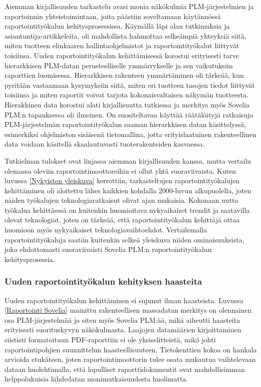 Aiemman kirjallisuuden tarkastelu avasi monia näkökulmia PLM-järjestelmien ja raportoinnin yhteistoimintaan, joita päästiin soveltamaan käytännössä raportointityökalun kehitysprosessissa. Käymällä läpi alan tutkimuksia ja asiantuntija-artikkeleita, oli mahdollista hahmottaa selkeämpiä yhteyksiä siitä, miten tuotteen elinkaaren hallintaohjelmistot ja raportointityökalut liittyvät toisiinsa. Uuden raportointityökalun kehittämisessä korostui erityisesti tarve  hierarkkisen PLM-datan perusteelliselle ymmärrykselle ja sen vaikutuksiin raporttien luomisessa. Hierarkkisen rakenteen ymmärtäminen oli tärkeää, kun pyritään vastaamaan kysymyksiin siitä, miten eri tuotteen tasojen tiedot liittyvät toisiinsa ja miten raportit voivat tarjota kokonaisvaltaisen näkymän tuotteesta. Hierakkinen data korostui alati kirjallisuutta tutkiessa ja merkitys myös Sovelia PLM:n tapauksessa oli ilmeinen. On suositeltavaa käyttää räätälöityjä ratkaisuja PLM-järjestelmän raportointityökalun saaman hierarkkisen datan käsittelyssä, esimerkiksi ohjelmiston sisäisenä tietomallina, jotta erityislaatuinen rakenteellinen data voidaan käsitellä skaalautuvasti tuoterakenteiden kasvaessa.

Tutkielman tulokset ovat linjassa aiemman kirjallisuuden kanssa, mutta vertailu olemassa oleviin raportointimoottoreihin ei ollut yhtä suoraviivaista. Kuten luvussa \ref{Nykyisten yleiskuva} kerrottiin, tarkasteltujen raportointityökalujen kehittäminen oli aloitettu lähes kaikkien kohdalla 2000-luvun alkupuolella, joten näiden työkalujen teknologiaratkaisut olivat ajan mukaisia. Kokonaan uutta työkalua kehittäessä on kuitenkin huomioitava nykyaikaiset trendit ja saatavilla olevat teknologiat, joten on tärkeää, että raportointityökalun kehittäjä ottaa huomioon myös nykyaikaiset teknologiavaihtoehdot. Vertailemalla raportointityökaluja saatiin kuitenkin selkeä yleiskuva niiden ominaisuuksista, joka ehdottomasti suoraviivaisti Sovelia PLM:n raportointityökalun kehitysprosessia.

\subsubsection{Uuden raportointityökalun kehityksen haasteita}

Uuden raportointityökalun kehittäminen ei sujunut ilman haasteista. Luvussa \ref{Raportointi Sovelia} mainittu rakenteellisen massadatan merkitys on olennainen osa PLM-järjestelmää ja siten myös Sovelia PLM:ää, mikä aiheutti haasteita erityisesti suorituskyvyn näkökulmasta. Laajojen datamäärien kirjoittaminen siististi formatoituun PDF-raporttiin ei ole yksiselitteistä, mikä johti raportointipohjien suunnittelun haasteellisuuteen. Tietokenttien kokoa on hankala arvioida etukäteen, joten raportointimoottorin tulee osata mukautua vaihtelevaan dataan huolehtimalla, että lopulliset raporttidokumentit ovat mahdollisimman helppolukuisia lähdedatan monimutkaisuudesta huolimatta.

